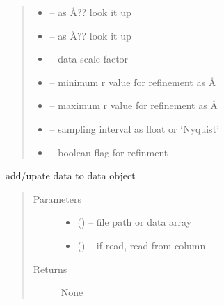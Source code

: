 \documentclass[letterpaper,10pt,english]{sphinxmanual}
\begin{document}
\begin{fulllineitems}
\begin{fulllineitems}
\begin{quote}
\begin{description}
\begin{itemize}
\item {} 
 -- as Å?? look it up

\item {} 
 -- as Å?? look it up

\item {} 
 -- data scale factor

\item {} 
 -- minimum r value for refinement as Å

\item {} 
 -- maximum r value for refinement as Å

\item {} 
 -- sampling interval as float or `Nyquist'

\item {} 
 -- boolean flag for refinment

\end{itemize}

\end{description}\end{quote}

\end{fulllineitems}


\begin{fulllineitems}
\label{\detokenize{rst/pairdistributionfunction:mstack.pairdistributionfunction.PdfData.update_data}}
add/upate data  to data object
\begin{quote}\begin{description}
\item[{Parameters}] \leavevmode\begin{itemize}
\item {} 
 () -- file path or data array

\item {} 
 () -- if read, read from column

\end{itemize}

\item[{Returns}] \leavevmode
None

\end{description}\end{quote}

\end{fulllineitems}


\end{fulllineitems}
\end{document}
